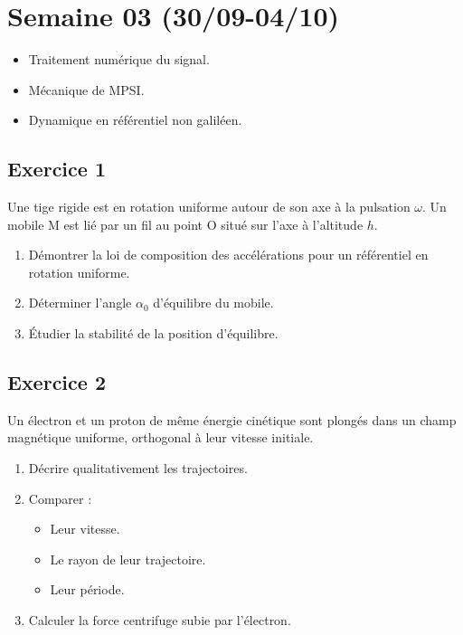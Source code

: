 \section{Semaine 03 (30/09-04/10) }

\begin{itemize}
	\item Traitement numérique du signal.
	\item Mécanique de MPSI.
	\item Dynamique en référentiel non galiléen.
\end{itemize}

\subsection{Exercice 1}

Une tige rigide est en rotation uniforme autour de son axe à la pulsation $\omega$. Un mobile M est lié par un fil au point O situé sur l'axe à l'altitude $h$. 

\begin{enumerate}
	\item Démontrer la loi de composition des accélérations pour un référentiel en rotation uniforme.
	\item Déterminer l'angle $\alpha_0$ d'équilibre du mobile.
	\item Étudier la stabilité de la position d'équilibre.
\end{enumerate}

\subsection{Exercice 2}

Un électron et un proton de même énergie cinétique sont plongés dans un champ magnétique uniforme, orthogonal à leur vitesse initiale.

\begin{enumerate}
	\item Décrire qualitativement les trajectoires.
	\item Comparer :
	\begin{itemize}
		\item Leur vitesse.
		\item Le rayon de leur trajectoire.
		\item Leur période.
	\end{itemize}
	\item Calculer la force centrifuge subie par l'électron.
\end{enumerate}

